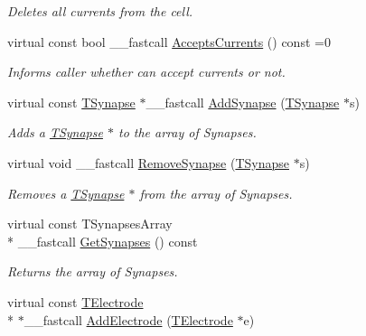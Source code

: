 \begin{DoxyCompactItemize}
\begin{DoxyCompactList}\small\item\em Deletes all currents from the cell. \end{DoxyCompactList}\item 
\hypertarget{class_t_cell_a4d5ecf99d9b4ec0f08d43eac2cbe1b54}{virtual const bool \+\_\+\+\_\+fastcall \hyperlink{class_t_cell_a4d5ecf99d9b4ec0f08d43eac2cbe1b54}{Accepts\+Currents} () const =0}\label{class_t_cell_a4d5ecf99d9b4ec0f08d43eac2cbe1b54}

\begin{DoxyCompactList}\small\item\em Informs caller whether can accept currents or not. \end{DoxyCompactList}\item 
\hypertarget{class_t_cell_a9b2c6a2758b286d456a46dbf917e6c72}{virtual const \hyperlink{class_t_synapse}{T\+Synapse} $\ast$\+\_\+\+\_\+fastcall \hyperlink{class_t_cell_a9b2c6a2758b286d456a46dbf917e6c72}{Add\+Synapse} (\hyperlink{class_t_synapse}{T\+Synapse} $\ast$s)}\label{class_t_cell_a9b2c6a2758b286d456a46dbf917e6c72}

\begin{DoxyCompactList}\small\item\em Adds a \hyperlink{class_t_synapse}{T\+Synapse} $\ast$ to the array of Synapses. \end{DoxyCompactList}\item 
\hypertarget{class_t_cell_aec972dfd296c80ab77b8bfcfab5746dd}{virtual void \+\_\+\+\_\+fastcall \hyperlink{class_t_cell_aec972dfd296c80ab77b8bfcfab5746dd}{Remove\+Synapse} (\hyperlink{class_t_synapse}{T\+Synapse} $\ast$s)}\label{class_t_cell_aec972dfd296c80ab77b8bfcfab5746dd}

\begin{DoxyCompactList}\small\item\em Removes a \hyperlink{class_t_synapse}{T\+Synapse} $\ast$ from the array of Synapses. \end{DoxyCompactList}\item 
\hypertarget{class_t_cell_a1382dc952b5116fa6dfd12b9b184c734}{virtual const T\+Synapses\+Array \\*
\+\_\+\+\_\+fastcall \hyperlink{class_t_cell_a1382dc952b5116fa6dfd12b9b184c734}{Get\+Synapses} () const }\label{class_t_cell_a1382dc952b5116fa6dfd12b9b184c734}

\begin{DoxyCompactList}\small\item\em Returns the array of Synapses. \end{DoxyCompactList}\item 
\hypertarget{class_t_cell_ab80546f10ffdac768ec2ec51924fda32}{virtual const \hyperlink{class_t_electrode}{T\+Electrode} \\*
$\ast$\+\_\+\+\_\+fastcall \hyperlink{class_t_cell_ab80546f10ffdac768ec2ec51924fda32}{Add\+Electrode} (\hyperlink{class_t_electrode}{T\+Electrode} $\ast$e)}\label{class_t_cell_ab80546f10ffdac768ec2ec51924fda32}


\end{DoxyCompactItemize}
